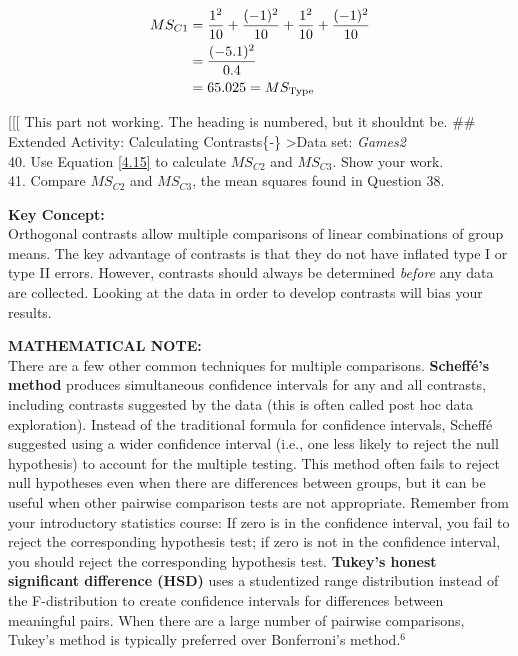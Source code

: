 \documentclass[
]{report}
\begin{document}
\begin{align}
MS_{C1} &= \frac{1^2}{10} + \frac{(-1)^2}{10} + \frac{1^2}{10} + \frac{(-1)^2}{10} \notag \\
        &= \frac{(-5.1)^2}{0.4} \notag \\
        &= 65.025 = MS_{\text{Type}} \notag
\end{align}

{[}{[}{[} This part not working. The heading is numbered, but it shouldnt be.
\#\# Extended Activity: Calculating Contrasts\{‑\}
\textgreater Data set: \emph{Games2}\\
40. Use Equation \ref{4.15} to calculate \(MS_{C2}\) and \(MS_{C3}\). Show your work.\\
41. Compare \(MS_{C2}\) and \(MS_{C3}\), the mean squares found in Question 38.

\large

\textbf{Key Concept:}\\
Orthogonal contrasts allow multiple comparisons of linear combinations of group means. The key advantage of contrasts is that they do not have inflated type I or type II errors. However, contrasts should always be determined \emph{before} any data are collected. Looking at the data in order to develop contrasts will bias your results.
\normalsize

\large

\textbf{MATHEMATICAL NOTE:}\\
There are a few other common techniques for multiple comparisons. \textbf{Scheffé's method} produces simultaneous confidence intervals for any and all contrasts, including contrasts suggested by the data (this is often called post hoc data exploration). Instead of the traditional formula for confidence intervals, Scheffé suggested using a wider confidence interval (i.e., one less likely to reject the null hypothesis) to account for the multiple testing. This method often fails to reject null hypotheses even when there are differences between groups, but it can be useful when other pairwise comparison tests are not appropriate. Remember from your introductory statistics course: If zero is in the confidence interval, you fail to reject the corresponding hypothesis test; if zero is not in the confidence interval, you should reject the corresponding hypothesis test. \textbf{Tukey's honest significant difference (HSD)} uses a studentized range distribution instead of the F-distribution to create confidence intervals for differences between meaningful pairs. When there are a large number of pairwise comparisons, Tukey's method is typically preferred over Bonferroni's method.\(^6\)
\normalsize
\end{document}
